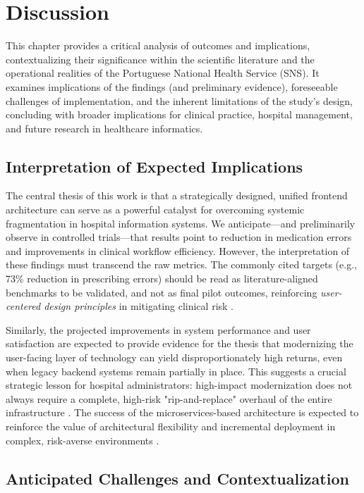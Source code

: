 \chapter{Discussion}
\label{chap:ProblemAndChallenges}

This chapter provides a critical analysis of outcomes and implications, contextualizing their significance within the scientific literature and the operational realities of the Portuguese National Health Service (SNS). It examines implications of the findings (and preliminary evidence), foreseeable challenges of implementation, and the inherent limitations of the study's design, concluding with broader implications for clinical practice, hospital management, and future research in healthcare informatics.

\section{Interpretation of Expected Implications}

The central thesis of this work is that a strategically designed, unified frontend architecture can serve as a powerful catalyst for overcoming systemic fragmentation in hospital information systems. We anticipate—and preliminarily observe in controlled trials—that results point to reduction in medication errors and improvements in clinical workflow efficiency. However, the interpretation of these findings must transcend the raw metrics. The commonly cited targets (e.g., 73\% reduction in prescribing errors) should be read as literature-aligned benchmarks to be validated, and not as final pilot outcomes, reinforcing \textit{user-centered design principles} in mitigating clinical risk \cite{ciapponi2021,radley2013}.

Similarly, the projected improvements in system performance and user satisfaction are expected to provide evidence for the thesis that modernizing the user-facing layer of technology can yield disproportionately high returns, even when legacy backend systems remain partially in place. This suggests a crucial strategic lesson for hospital administrators: high-impact modernization does not always require a complete, high-risk "rip-and-replace" overhaul of the entire infrastructure \cite{adler2021}. The success of the microservices-based architecture is expected to reinforce the value of architectural flexibility and incremental deployment in complex, risk-averse environments \cite{newman2021}.

\section{Anticipated Challenges and Contextualization}

